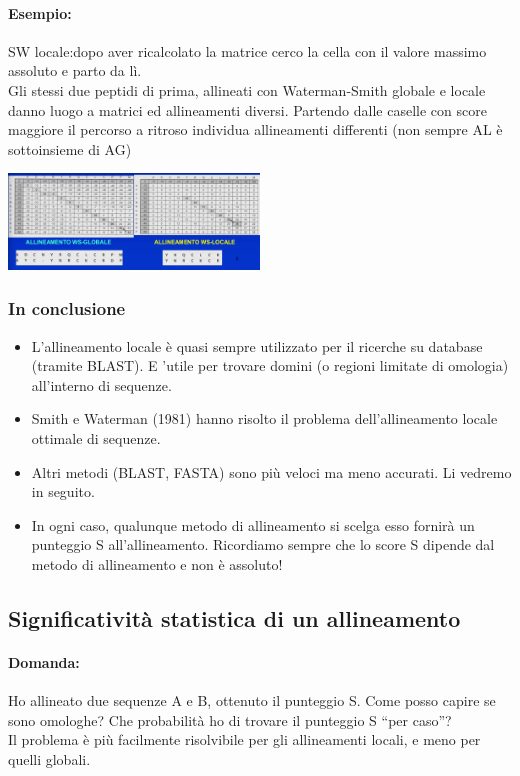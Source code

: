 \documentclass{article}
\begin{document}
\paragraph{Esempio:} SW locale:dopo aver ricalcolato la matrice
cerco la cella con il valore massimo assoluto e parto da lì.\\
Gli stessi due peptidi di prima, allineati con Waterman-Smith
globale e locale danno luogo a matrici ed allineamenti
diversi. Partendo dalle caselle con score maggiore il
percorso a ritroso individua allineamenti differenti (non
sempre AL è sottoinsieme di AG)
\begin{center}
    \includegraphics[width=0.5\textwidth]{figures/es2.png}\\
\end{center}
\subsubsection{In conclusione}
\begin{itemize}
    \item L'allineamento locale è quasi sempre utilizzato per il ricerche su
    database (tramite BLAST). E 'utile per trovare domini (o regioni
    limitate di omologia) all'interno di sequenze.
    \item Smith e Waterman (1981) hanno risolto il problema
    dell'allineamento locale ottimale di sequenze.
    \item Altri metodi (BLAST, FASTA) sono più veloci ma meno accurati.
    Li vedremo in seguito.
    \item In ogni caso, qualunque metodo di allineamento si scelga esso
    fornirà un punteggio S all'allineamento. Ricordiamo sempre che lo
    score S dipende dal metodo di allineamento e non è assoluto!
\end{itemize}
\subsection{Significatività statistica di un allineamento}
\paragraph{Domanda:}Ho allineato due sequenze A e B, ottenuto il punteggio S.
Come posso capire se sono omologhe? Che probabilità ho di
trovare il punteggio S “per caso”?\\
Il problema è più facilmente risolvibile per gli allineamenti
locali, e meno per quelli globali.
\end{document}
